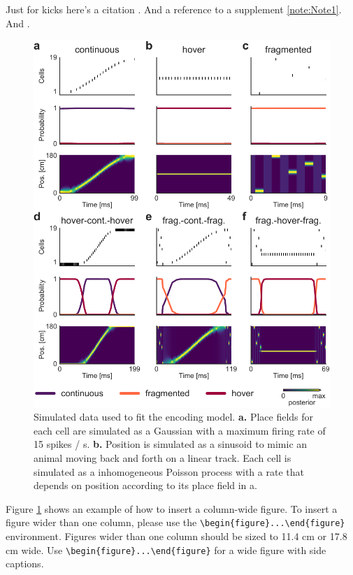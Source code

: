 \documentclass[times, twoside, watermark]{zHenriquesLab-StyleBioRxiv}
\begin{document}
Just for kicks here's a citation \cite{Gustafsson2016}. And a reference to a supplement \cref{note:Note1}. And .
\Blindtext

\begin{figure}%
\centering
\includegraphics[width=1.0\linewidth]{figures/Figure2.pdf}
\caption{Simulated data used to fit the encoding model. \textbf{a.} Place fields for each cell are simulated as a Gaussian with a maximum firing rate of 15 spikes / s. \textbf{b.} Position is simulated as a sinusoid to mimic an animal moving back and forth on a linear track. Each cell is simulated as a inhomogeneous Poisson process with a rate that depends on position according to its place field in a.}
\label{fig:computerNo}
\end{figure}

\Blindtext

Figure \ref{fig:computerNo} shows an example of how to insert a column-wide figure. To insert a figure wider than one column, please use the \verb|\begin{figure}...\end{figure}| environment. Figures wider than one column should be sized to 11.4 cm or 17.8 cm wide. Use \verb|\begin{figure}...\end{figure}| for a wide figure with side captions.
\end{document}
